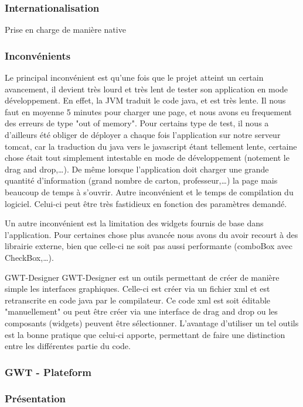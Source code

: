  \subsubsection{Internationalisation}
Prise en charge de manière native

\subsubsection{Inconvénients}
Le principal inconvénient est qu'une fois que le projet atteint un certain avancement, il devient très lourd et très lent de tester son application en mode développement. En effet, la JVM traduit le code java, et est très lente. Il nous faut en moyenne 5 minutes pour charger une page, et nous avons eu frequement des erreurs de type "out of memory". Pour certains type de test, il nous a d'ailleurs été obliger de déployer a chaque fois l'application sur notre serveur tomcat, car la traduction du java vers le javascript étant tellement lente, certaine chose était tout simplement intestable en mode de développement (notement le drag and drop,…). De même lorsque l'application doit charger une grande quantité d'information (grand nombre de carton, professeur,…) la page mais beaucoup de temps à s'ouvrir.
Autre inconvénient et le temps de compilation du logiciel. Celui-ci peut être très fastidieux en fonction des paramètres demandé.
	
Un autre inconvénient est la limitation des widgets fournis de base dans l'application. Pour certaines chose plus avancée nous avons du avoir recourt à des librairie externe, bien que celle-ci ne soit pas aussi performante (comboBox avec CheckBox,…).

GWT-Designer
GWT-Designer est un outils permettant de créer de manière simple les interfaces graphiques. Celle-ci est créer via un fichier xml et est retranscrite en code java par le compilateur. Ce code xml est soit éditable "manuellement" ou peut être créer via une interface de drag and drop ou les composants (widgets) peuvent être sélectionner. L'avantage d'utiliser un tel outils est la bonne pratique que celui-ci apporte, permettant de faire une distinction entre les différentes partie du code.

\subsubsection{GWT - Plateform}

\subsubsection{Présentation}

